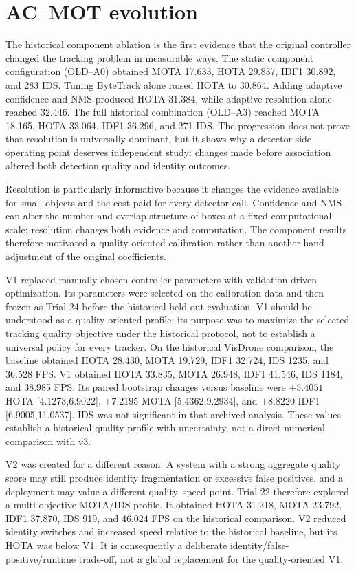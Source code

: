 \section{AC--MOT evolution}
The historical component ablation is the first evidence that the original controller changed the tracking problem in measurable ways. The static component configuration (OLD--A0) obtained MOTA 17.633, HOTA 29.837, IDF1 30.892, and 283 IDS. Tuning ByteTrack alone raised HOTA to 30.864. Adding adaptive confidence and NMS produced HOTA 31.384, while adaptive resolution alone reached 32.446. The full historical combination (OLD--A3) reached MOTA 18.165, HOTA 33.064, IDF1 36.296, and 271 IDS. The progression does not prove that resolution is universally dominant, but it shows why a detector-side operating point deserves independent study: changes made before association altered both detection quality and identity outcomes.

Resolution is particularly informative because it changes the evidence available for small objects and the cost paid for every detector call. Confidence and NMS can alter the number and overlap structure of boxes at a fixed computational scale; resolution changes both evidence and computation. The component results therefore motivated a quality-oriented calibration rather than another hand adjustment of the original coefficients.

V1 replaced manually chosen controller parameters with validation-driven optimization. Its parameters were selected on the calibration data and then frozen as Trial 24 before the historical held-out evaluation. V1 should be understood as a quality-oriented profile: its purpose was to maximize the selected tracking quality objective under the historical protocol, not to establish a universal policy for every tracker. On the historical VisDrone comparison, the baseline obtained HOTA 28.430, MOTA 19.729, IDF1 32.724, IDS 1235, and 36.528 FPS. V1 obtained HOTA 33.835, MOTA 26.948, IDF1 41.546, IDS 1184, and 38.985 FPS. Its paired bootstrap changes versus baseline were $+5.4051$ HOTA [4.1273,6.9022], $+7.2195$ MOTA [5.4362,9.2934], and $+8.8220$ IDF1 [6.9005,11.0537]. IDS was not significant in that archived analysis. These values establish a historical quality profile with uncertainty, not a direct numerical comparison with v3.

V2 was created for a different reason. A system with a strong aggregate quality score may still produce identity fragmentation or excessive false positives, and a deployment may value a different quality--speed point. Trial 22 therefore explored a multi-objective MOTA/IDS profile. It obtained HOTA 31.218, MOTA 23.792, IDF1 37.870, IDS 919, and 46.024 FPS on the historical comparison. V2 reduced identity switches and increased speed relative to the historical baseline, but its HOTA was below V1. It is consequently a deliberate identity/false-positive/runtime trade-off, not a global replacement for the quality-oriented V1.

